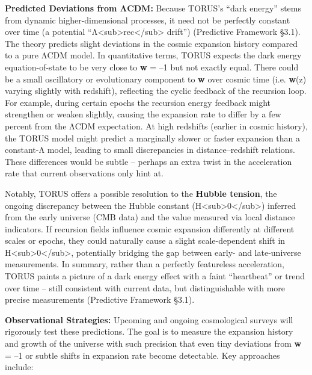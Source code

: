 \documentclass[
]{article}
\begin{document}
\textbf{Predicted Deviations from ΛCDM:} Because TORUS's ``dark energy''
stems from dynamic higher-dimensional processes, it need not be
perfectly constant over time (a potential
``Λ\textless sub\textgreater rec\textless/sub\textgreater{} drift'')
(Predictive Framework §3.1). The theory predicts slight deviations in
the cosmic expansion history compared to a pure ΛCDM model. In
quantitative terms, TORUS expects the dark energy equation-of-state to
be very close to \textbf{w} = --1 but not exactly equal. There could be
a small oscillatory or evolutionary component to \textbf{w} over cosmic
time (i.e. \textbf{w}(z) varying slightly with redshift), reflecting the
cyclic feedback of the recursion loop. For example, during certain
epochs the recursion energy feedback might strengthen or weaken
slightly, causing the expansion rate to differ by a few percent from the
ΛCDM expectation. At high redshifts (earlier in cosmic history), the
TORUS model might predict a marginally slower or faster expansion than a
constant-Λ model, leading to small discrepancies in distance--redshift
relations. These differences would be subtle -- perhaps an extra twist
in the acceleration rate that current observations only hint at.

Notably, TORUS offers a possible resolution to the \textbf{Hubble
tension}, the ongoing discrepancy between the Hubble constant
(H\textless sub\textgreater0\textless/sub\textgreater) inferred from the
early universe (CMB data) and the value measured via local distance
indicators. If recursion fields influence cosmic expansion differently
at different scales or epochs, they could naturally cause a slight
scale-dependent shift in
H\textless sub\textgreater0\textless/sub\textgreater, potentially
bridging the gap between early- and late-universe measurements. In
summary, rather than a perfectly featureless acceleration, TORUS paints
a picture of a dark energy effect with a faint ``heartbeat'' or trend
over time -- still consistent with current data, but distinguishable
with more precise measurements (Predictive Framework §3.1).

\textbf{Observational Strategies:} Upcoming and ongoing cosmological
surveys will rigorously test these predictions. The goal is to measure
the expansion history and growth of the universe with such precision
that even tiny deviations from \textbf{w} = --1 or subtle shifts in
expansion rate become detectable. Key approaches include:
\end{document}
